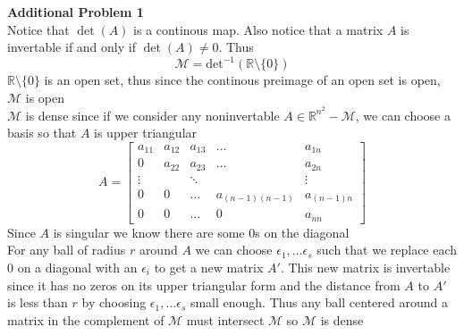 \documentclass[12pt]{article}
\newenvironment{ques}[1]{\textbf{#1}\vspace{1 mm}\\ }{\bigskip}
\theoremstyle{definition}
\newcommand{\R}{\mathbb R}
\begin{document}
\begin{ques}{Additional Problem 1}
	Notice that $\det(A)$ is a continous map. Also notice that a matrix $A$ is
	invertable if and only if $\det(A) \neq 0$. Thus
	$$\mathcal M = \text{det}^{-1}(\R \setminus \{0\})$$
	$\R \setminus \{0\}$ is an open set, thus since the continous preimage of
	an open set is open, $\mathcal M$ is open\\
	$\mathcal M$ is dense since if we consider any noninvertable $A \in
	\R^{n^2} - \mathcal M$, we can choose a basis so that $A$ is upper
	triangular 
	$$A = 
	\begin{bmatrix}
	a_{11} & a_{12} & a_{13} & \dots & a_{1n}\\
	0 & a_{22} & a_{23} & \dots & a_{2n}\\
	\vdots &  & \ddots & & \vdots\\
	0 & 0 & \dots & a_{(n-1)(n-1)} & a_{(n-1)n}\\
	0 & 0 & \dots & 0 & a_{nn}
	\end{bmatrix}$$
	Since $A$ is singular we know there are some $0$s on the diagonal\\
	For any ball of radius $r$ around $A$ we can choose $\epsilon_1, \dots
	\epsilon_s$ such that we replace each $0$ on a diagonal with an
	$\epsilon_i$ to get a new matrix $A'$. This new matrix is invertable since
	it has no zeros on its upper triangular form and the distance from $A$ to
	$A'$ is less than $r$ by choosing $\epsilon_1, \dots \epsilon_s$ small
	enough. Thus any ball centered around a matrix in the complement of
	$\mathcal M$ must intersect $\mathcal M$ so $\mathcal M$ is dense
\end{ques}
\end{document}
